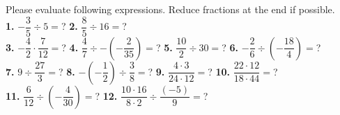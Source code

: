 \documentclass[a4paper]{article}
\begin{document}
\begin{Large}

Please evaluate following expressions. Reduce fractions at the end if possible. \\[0.75cm]
		
\textbf{1.} $- \dfrac{3}{5} \div 5 =$? \hspace{0.2cm}
\textbf{2.} $\dfrac{8}{5} \div 16 =$? \\[0.75cm]
\textbf{3.} $- \dfrac{4}{2} \cdot \dfrac{7}{12} =$? \hspace{0.2cm}
\textbf{4.} $\dfrac{4}{7} \div - (-\dfrac{2}{35}) =$? \hspace{0.2cm}
\textbf{5.} $\dfrac{10}{2} \div 30 =$? \hspace{0.2cm}
\textbf{6.} $- \dfrac{2}{6} \div (- \dfrac{18}{4}) =$? \\[0.75cm]
\textbf{7.} $9 \div \dfrac{27}{3} =$? \hspace{0.2cm}
\textbf{8.} $- (-\dfrac{1}{2}) \div \dfrac{3}{8} =$? \hspace{0.2cm}
\textbf{9.} $\dfrac{4 \cdot 3}{24 \cdot 12}=$? \hspace{0.2cm}
\textbf{10.} $\dfrac{22 \cdot 12}{18 \cdot 44}=$? \\[0.75cm]
\textbf{11.} $\dfrac{6}{12} \div (- \dfrac{4}{30}) =$? \hspace{0.2cm}
\textbf{12.} $\dfrac{10 \cdot 16}{8 \cdot 2} \div \dfrac{(-5)}{9} =$? \hspace{0.2cm}

\end{Large}
\end{document}
